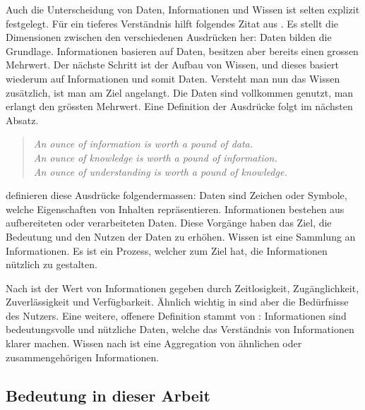  Auch die Unterscheidung von Daten, Informationen und Wissen ist selten explizit festgelegt. Für ein tieferes Verständnis hilft folgendes Zitat  aus \cite{ackoff1989data}. Es stellt die Dimensionen zwischen den verschiedenen Ausdrücken her: Daten bilden die Grundlage. Informationen basieren auf Daten, besitzen aber bereits einen grossen Mehrwert. Der nächste Schritt ist der Aufbau von Wissen, und dieses basiert wiederum auf Informationen und somit Daten. Versteht man nun das Wissen zusätzlich, ist man am Ziel angelangt. Die Daten sind vollkommen genutzt, man erlangt den grössten Mehrwert. Eine Definition der Ausdrücke folgt im nächsten Absatz.
\newpage
\begin{quote}\label{wissen-zitat}
\textit{An ounce of information is worth a pound of data.}\\
\textit{An ounce of knowledge is worth a pound of information.}\\
\textit{An ounce of understanding is worth a pound of knowledge.}\\
\end{quote}

 \cite{bellinger2004data} definieren diese Ausdrücke folgendermassen:
 Daten sind Zeichen oder Symbole, welche Eigenschaften von Inhalten repräsentieren. Informationen bestehen aus aufbereiteten oder verarbeiteten Daten. Diese Vorgänge haben das Ziel, die Bedeutung und den Nutzen der Daten zu erhöhen. Wissen ist eine Sammlung an Informationen. Es ist ein Prozess, welcher zum Ziel hat, die Informationen nützlich zu gestalten.
 
 Nach \cite{chen2005information} ist der Wert von Informationen gegeben durch Zeitlosigkeit, Zugänglichkeit, Zuverlässigkeit und Verfügbarkeit. Ähnlich wichtig in \cite{choo1996knowing} sind aber die Bedürfnisse des Nutzers. Eine weitere, offenere Definition stammt von \cite{bierly2000organizational}: Informationen sind bedeutungsvolle und nützliche Daten, welche das Verständnis von Informationen klarer machen. Wissen nach \cite{barlas2005self} ist eine Aggregation von ähnlichen oder zusammengehörigen Informationen. 


\subsection{Bedeutung in dieser Arbeit}



